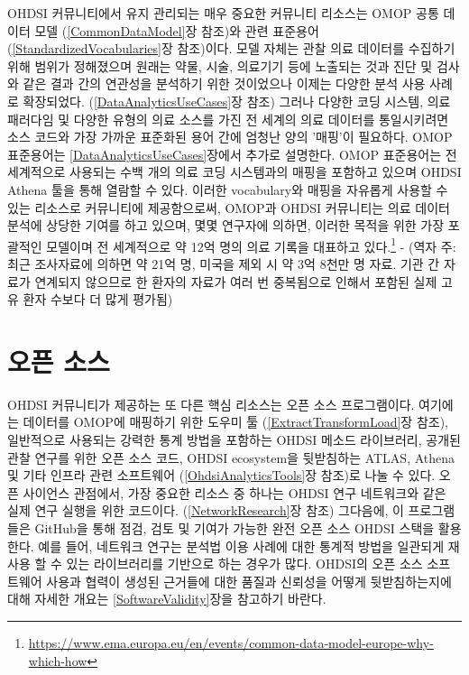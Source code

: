 \documentclass[11pt]{book}
\let\rmarkdownfootnote\footnote%
\def\footnote{\protect\rmarkdownfootnote}
\theoremstyle{definition}
\theoremstyle{definition}
\theoremstyle{definition}
\theoremstyle{remark}
\begin{document}

OHDSI 커뮤니티에서 유지 관리되는 매우 중요한 커뮤니티 리소스는 OMOP 공통
데이터 모델 (\ref{CommonDataModel}장 참조)와 관련 표준용어
(\ref{StandardizedVocabularies}장 참조)이다. 모델 자체는 관찰 의료
데이터를 수집하기 위해 범위가 정해졌으며 원래는 약물, 시술, 의료기기
등에 노출되는 것과 진단 및 검사와 같은 결과 간의 연관성을 분석하기 위한
것이었으나 이제는 다양한 분석 사용 사례로 확장되었다.
(\ref{DataAnalyticsUseCases}장 참조) 그러나 다양한 코딩 시스템, 의료
패러다임 및 다양한 유형의 의료 소스를 가진 전 세계의 의료 데이터를
통일시키려면 소스 코드와 가장 가까운 표준화된 용어 간에 엄청난 양의
'매핑'이 필요하다. OMOP 표준용어는 \ref{DataAnalyticsUseCases}장에서
추가로 설명한다. OMOP 표준용어는 전 세계적으로 사용되는 수백 개의 의료
코딩 시스템과의 매핑을 포함하고 있으며 OHDSI Athena 툴을 통해 열람할 수
있다. 이러한 vocabulary와 매핑을 자유롭게 사용할 수 있는 리소스로
커뮤니티에 제공함으로써, OMOP과 OHDSI 커뮤니티는 의료 데이터 분석에
상당한 기여를 하고 있으며, 몇몇 연구자에 의하면, 이러한 목적을 위한 가장
포괄적인 모델이며 전 세계적으로 약 12억 명의 의료 기록을 대표하고
있다.\footnote{\url{https://www.ema.europa.eu/en/events/common-data-model-europe-why-which-how}}
\citep{garza_2016} - (역자 주: 최근 조사자료에 의하면 약 21억 명, 미국을
제외 시 약 3억 8천만 명 자료. 기관 간 자료가 연계되지 않으므로 한 환자의
자료가 여러 번 중복됨으로 인해서 포함된 실제 고유 환자 수보다 더 많게
평가됨)

\section{오픈 소스}\label{-}


OHDSI 커뮤니티가 제공하는 또 다른 핵심 리소스는 오픈 소스 프로그램이다.
여기에는 데이터를 OMOP에 매핑하기 위한 도우미 툴
(\ref{ExtractTransformLoad}장 참조), 일반적으로 사용되는 강력한 통계
방법을 포함하는 OHDSI 메소드 라이브러리, 공개된 관찰 연구를 위한 오픈
소스 코드, OHDSI ecosystem을 뒷받침하는 ATLAS, Athena 및 기타 인프라
관련 소프트웨어 (\ref{OhdsiAnalyticsTools}장 참조)로 나눌 수 있다. 오픈
사이언스 관점에서, 가장 중요한 리소스 중 하나는 OHDSI 연구 네트워크와
같은 실제 연구 실행을 위한 코드이다. (\ref{NetworkResearch}장 참조)
그다음에, 이 프로그램들은 GitHub을 통해 점검, 검토 및 기여가 가능한 완전
오픈 소스 OHDSI 스택을 활용한다. 예를 들어, 네트워크 연구는 분석법 이용
사례에 대한 통계적 방법을 일관되게 재사용 할 수 있는 라이브러리를
기반으로 하는 경우가 많다. OHDSI의 오픈 소스 소프트웨어 사용과 협력이
생성된 근거들에 대한 품질과 신뢰성을 어떻게 뒷받침하는지에 대해 자세한
개요는 \ref{SoftwareValidity}장을 참고하기 바란다.
\end{document}
